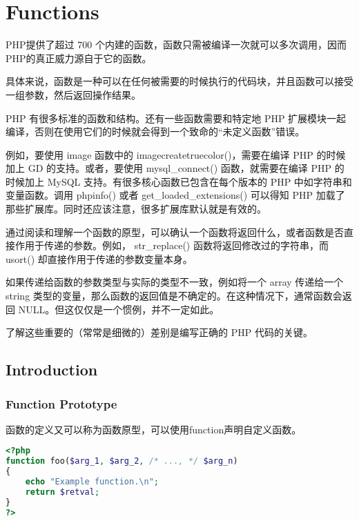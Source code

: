 \part{Functions}

PHP提供了超过 700 个内建的函数，函数只需被编译一次就可以多次调用，因而PHP的真正威力源自于它的函数。


具体来说，函数是一种可以在任何被需要的时候执行的代码块，并且函数可以接受一组参数，然后返回操作结果。



PHP 有很多标准的函数和结构。还有一些函数需要和特定地 PHP 扩展模块一起编译，否则在使用它们的时候就会得到一个致命的“未定义函数”错误。

例如，要使用 image 函数中的 imagecreatetruecolor()，需要在编译 PHP 的时候加上 GD 的支持。或者，要使用 mysql\_connect() 函数，就需要在编译 PHP 的时候加上 MySQL 支持。有很多核心函数已包含在每个版本的 PHP 中如字符串和变量函数。调用 phpinfo() 或者 get\_loaded\_extensions() 可以得知 PHP 加载了那些扩展库。同时还应该注意，很多扩展库默认就是有效的。

通过阅读和理解一个函数的原型，可以确认一个函数将返回什么，或者函数是否直接作用于传递的参数。例如， str\_replace() 函数将返回修改过的字符串，而 usort() 却直接作用于传递的参数变量本身。



如果传递给函数的参数类型与实际的类型不一致，例如将一个 array 传递给一个 string 类型的变量，那么函数的返回值是不确定的。在这种情况下，通常函数会返回 NULL。但这仅仅是一个惯例，并不一定如此。

了解这些重要的（常常是细微的）差别是编写正确的 PHP 代码的关键。



\chapter{Introduction}


\section{Function Prototype}



函数的定义又可以称为函数原型，可以使用function声明自定义函数。

\begin{lstlisting}[language=PHP]
<?php
function foo($arg_1, $arg_2, /* ..., */ $arg_n)
{
    echo "Example function.\n";
    return $retval;
}
?>
\end{lstlisting}




